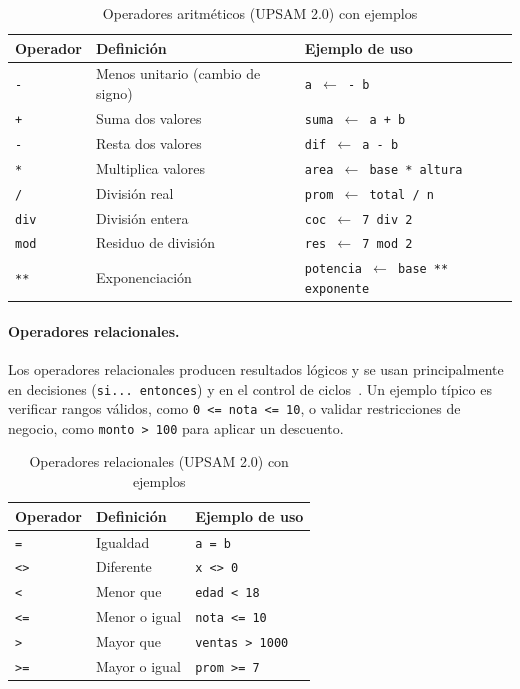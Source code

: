 \documentclass[12pt,twoside]{book}
\begin{document}
							\begin{table}[h]
								\centering
								\caption{Operadores aritméticos (UPSAM 2.0) con ejemplos}
								\label{tab:upsam_op_arit}
								\begin{tabular}{lll}
									\hline
									\textbf{Operador} & \textbf{Definición} & \textbf{Ejemplo de uso} \\
									\hline
									\texttt{-} & Menos unitario (cambio de signo) & \texttt{a $\leftarrow$ - b} \\
									\texttt{+} & Suma dos valores & \texttt{suma $\leftarrow$ a + b} \\
									\texttt{-} & Resta dos valores & \texttt{dif $\leftarrow$ a - b} \\
									\texttt{*} & Multiplica valores & \texttt{area $\leftarrow$ base * altura} \\
									\texttt{/} & División real & \texttt{prom $\leftarrow$ total / n} \\
									\texttt{div} & División entera & \texttt{coc $\leftarrow$ 7 div 2} \\
									\texttt{mod} & Residuo de división & \texttt{res $\leftarrow$ 7 mod 2} \\
									\texttt{**} & Exponenciación & \texttt{potencia $\leftarrow$ base ** exponente} \\
									\hline
								\end{tabular}
							\end{table}
							
						\paragraph{Operadores relacionales.}
							Los operadores relacionales producen resultados lógicos y se usan principalmente en decisiones (\texttt{si... entonces}) y en el control de ciclos~\cite{Cormen2022Introduction,Farrell2018Programming,Miller2011Problem}. Un ejemplo típico es verificar rangos válidos, como \texttt{0 <= nota <= 10}, o validar restricciones de negocio, como \texttt{monto > 100} para aplicar un descuento.
							
							\begin{table}[h]
								\centering
								\caption{Operadores relacionales (UPSAM 2.0) con ejemplos}
								\label{tab:upsam_op_rel}
								\begin{tabular}{lll}
									\hline
									\textbf{Operador} & \textbf{Definición} & \textbf{Ejemplo de uso} \\
									\hline
									\texttt{=} & Igualdad & \texttt{a = b} \\
									\texttt{<>} & Diferente & \texttt{x <> 0} \\
									\texttt{<} & Menor que & \texttt{edad < 18} \\
									\texttt{<=} & Menor o igual & \texttt{nota <= 10} \\
									\texttt{>} & Mayor que & \texttt{ventas > 1000} \\
									\texttt{>=} & Mayor o igual & \texttt{prom >= 7} \\
									\hline
								\end{tabular}
							\end{table}
				
\end{document}
